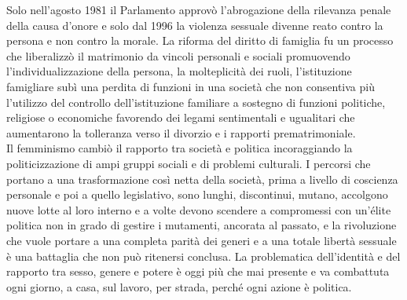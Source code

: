 Solo nell'agosto 1981 il Parlamento approvò l'abrogazione della rilevanza penale della causa d'onore e solo dal 1996 la violenza sessuale divenne reato contro la persona e non contro la morale.
La riforma del diritto di famiglia fu un processo che liberalizzò il matrimonio da vincoli personali e sociali promuovendo l'individualizzazione della persona, la molteplicità dei ruoli, l'istituzione famigliare subì una perdita di funzioni in una società che non consentiva più l'utilizzo del controllo dell'istituzione familiare a sostegno di funzioni politiche, religiose o economiche favorendo dei legami sentimentali e ugualitari che aumentarono la tolleranza verso il divorzio e i rapporti prematrimoniale.
\\Il femminismo cambiò il rapporto tra società e politica incoraggiando la politicizzazione di ampi gruppi sociali e di problemi culturali.
I percorsi che portano a una trasformazione così netta della società, prima a livello di coscienza personale e poi a quello legislativo, sono lunghi, discontinui, mutano, accolgono nuove lotte al loro interno e a volte devono scendere a compromessi con un'élite politica non in grado di gestire i mutamenti, ancorata al passato, e la rivoluzione che vuole portare a una completa parità dei generi e a una totale libertà sessuale è una battaglia che non può ritenersi conclusa.
La problematica dell'identità e del rapporto tra sesso, genere e potere è oggi più che mai presente e va combattuta ogni giorno, a casa, sul lavoro, per strada, perché ogni azione è politica. 



